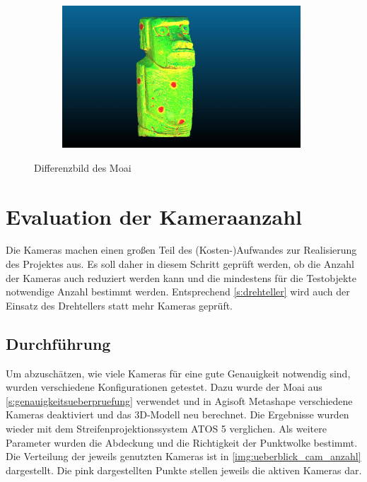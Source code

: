 \documentclass[./00PhotoBox.tex]{subfiles}
\begin{document}
\begin{figure}
\begin{subfigure}{0.10\textwidth}
    \end{subfigure}
    \begin{subfigure}{0.85\textwidth}
        \includegraphics[width=0.98\textwidth]{img/7_versuche/moai_fehler_drehteller.jpg}
    \end{subfigure}
    \caption{Differenzbild des Moai}
    \label{img:differenz_moai_drehteller}
\end{figure}



\section{Evaluation der Kameraanzahl}
\label{s:kameraanzahl}
Die Kameras machen einen großen Teil des (Kosten-)Aufwandes zur Realisierung des Projektes aus. Es soll daher in diesem Schritt geprüft werden, ob die Anzahl der Kameras auch reduziert werden kann und die mindestens für die Testobjekte notwendige Anzahl bestimmt werden. Entsprechend \autoref{s:drehteller} wird auch der Einsatz des Drehtellers statt mehr Kameras geprüft.

\subsection{Durchführung}
Um abzuschätzen, wie viele Kameras für eine gute Genauigkeit notwendig sind, wurden verschiedene Konfigurationen getestet. Dazu wurde der Moai aus \autoref{s:genauigkeitsueberpruefung} verwendet und in Agisoft Metashape verschiedene Kameras deaktiviert und das 3D-Modell neu berechnet. Die Ergebnisse wurden wieder mit dem Streifenprojektionssystem ATOS 5 verglichen. Als weitere Parameter wurden die Abdeckung und die Richtigkeit der Punktwolke bestimmt. Die Verteilung der jeweils genutzten Kameras ist in \autoref{img:ueberblick_cam_anzahl} dargestellt. Die pink dargestellten Punkte stellen jeweils die aktiven Kameras dar.
\end{document}
